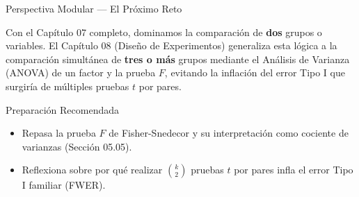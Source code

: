 \documentclass[10pt, aspectratio=169]{beamer}
\begin{document}
\begin{frame}{Perspectiva Modular --- El Próximo Reto}
  \scriptsize
  \begin{retoclase}
    Con el Capítulo 07 completo, dominamos la comparación de \textbf{dos} grupos o variables. El Capítulo 08 (Diseño de Experimentos) generaliza esta lógica a la comparación simultánea de \textbf{tres o más} grupos mediante el Análisis de Varianza (ANOVA) de un factor y la prueba $F$, evitando la inflación del error Tipo I que surgiría de múltiples pruebas $t$ por pares.
  \end{retoclase}

  \vspace{0.08cm}
  \pause
  \begin{alertblock}{Preparación Recomendada}
    \begin{itemize}\itemsep=0.06cm
      \item Repasa la prueba $F$ de Fisher-Snedecor y su interpretación como cociente de varianzas (Sección 05.05).
      \item Reflexiona sobre por qué realizar $\binom{k}{2}$ pruebas $t$ por pares infla el error Tipo I familiar (FWER).
    \end{itemize}
  \end{alertblock}
\end{frame}
\end{document}
